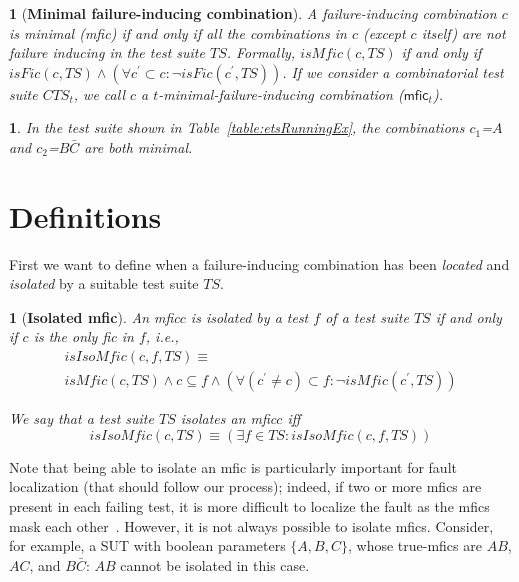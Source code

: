 \documentclass[
12pt, %
oneside, %
english, %
singlespacing, %
headsepline, %
consistentlayout, %
]{MastersDoctoralThesis} %
\newcommand{\fic}{\textsf{fic}\xspace}
\newcommand{\truemfics}{true-\textsf{mfics}\xspace}
\newcommand{\mfic}{\textsf{mfic}\xspace}
\newcommand{\mfics}{\textsf{mfics}\xspace}
\newcommand{\isFic}{\ensuremath{\mathit{isFic}}\xspace}
\newcommand{\isMfic}{\ensuremath{\mathit{isMfic}}\xspace}
\newcommand{\ts}{\ensuremath{\mathit{TS}}\xspace}
\newcommand{\cts}{\ensuremath{\mathit{CTS}}\xspace}
\newcommand{\isIsoMfic}{\ensuremath{\mathit{isIsoMfic}}\xspace}
\newtheorem{defn}[thm]{\protect\definitionname}
\newtheorem{example}[thm]{\protect\examplename}
\providecommand{\definitionname}{Definition}
\providecommand{\examplename}{Example}
\theoremstyle{plain}
\theoremstyle{definition}
\theoremstyle{remark}
\theoremstyle{plain}
\theoremstyle{plain}
\providecommand{\definitionname}{Definition}
\providecommand{\examplename}{Example}
\theoremstyle{remark}
\begin{document}
\begin{defn}[\textbf{Minimal failure-inducing combination}]\label{def:mfic}
	A failure-inducing combination $c$ is minimal (\mfic) if and only if all the combinations in $c$ (except $c$ itself) are not failure inducing in the test suite \ts. Formally, $\isMfic(c, \ts)$ if and only if $\isFic(c, \ts) \wedge (\forall c^\prime \subset c \colon \neg \mathit{\isFic(c^\prime, \ts)})$. If we consider a combinatorial test suite $\cts_t$, we call $c$ a $t$-minimal-failure-inducing combination ($\mfic_t$).
\end{defn}

\begin{example}\label{ex:minFic}
	In the test suite shown in Table~\ref{table:etsRunningEx}, the combinations $c_1$=$A$ and $c_2$=$B\bar{C}$ are both minimal.
\end{example}


\section{Definitions}\label{sec:definitions}

First we want to define when a failure-inducing combination has been \emph{located} and \emph{isolated} by a suitable test suite \ts.

\begin{defn}[\textbf{Isolated \mfic}]\label{def:isolatedMfic}
	An \mfic $c$ is {\it isolated} by a test $f$ of a test suite \ts if and only if $c$ is the only \fic in $f$, i.e.,
	\[\begin{array}{l}\isIsoMfic(c, f, \ts) \equiv\\
	\isMfic(c, \ts) \wedge c \subseteq f \wedge (\forall (c^\prime \neq c) \subset f \colon \neg \isMfic(c^\prime, \ts))\end{array}\]
	
	We say that a test suite \ts isolates an \mfic $c$ iff
	\[\isIsoMfic(c, \ts) \equiv (\exists f \in \ts \colon \isIsoMfic(c, f, \ts))\]
\end{defn}

Note that being able to isolate an \mfic is particularly important for fault localization (that should follow our process); indeed, if two or more \mfics are present in each failing test, it is more difficult to localize the fault as the \mfics mask each other~\cite{Niu2018Identifying}. However, it is not always possible to isolate \mfics. Consider, for example, a SUT with boolean parameters $\{A,B,C\}$, whose \truemfics are $AB$, $AC$, and $B\bar{C}$: $AB$ cannot be isolated in this case.
\end{document}
